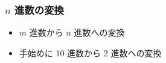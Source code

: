 \begin{frame}[label=Dec2Bin]
\frametitle{$n$ 進数の変換}
  \begin{itemize}
\item $m$ 進数から $n$ 進数への変換
\item 手始めに 10 進数から 2 進数への変換
  \end{itemize}
  \begin{center}
   \begin{example}[10進$\Leftrightarrow$2進]
   \begin{columns}[t]
    \begin{column}{3cm}
    \end{column}
    \begin{column}{3cm}
    \end{column}
   \end{columns}
   \end{example}
  \end{center}
\end{frame}
%
%
%
%
